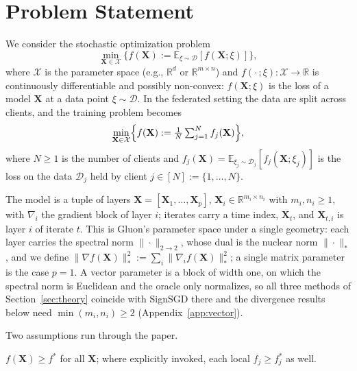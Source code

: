 \section{Problem Statement}\label{sec:proState}

We consider the stochastic optimization problem
\begin{equation}
\min_{\mathbf{X} \in \mathcal{X}} \{f(\mathbf{X}) := \mathbb{E}_{\xi \sim \mathcal{D}} [f(\mathbf{X};\xi)]\},
\end{equation}
where $\mathcal{X}$ is the parameter space (e.g., $\mathbb{R}^d$ or $\mathbb{R}^{m \times n}$) and $f(\cdot\,;\xi) : \mathcal{X} \to \mathbb{R}$ is continuously differentiable and possibly non-convex: $f(\mathbf{X};\xi)$ is the loss of a model $\mathbf{X}$ at a data point $\xi \sim \mathcal{D}$. In the federated setting the data are split across clients, and the training problem becomes
\begin{equation}
\min_{\mathbf{X} \in \mathcal{X}} \Bigl\{ f(\mathbf{X}) := \tfrac{1}{N}\textstyle\sum_{j=1}^N f_j(\mathbf{X})\Bigr\},
\label{fed_eq}
\end{equation}
where $N \ge 1$ is the number of clients and $f_j(\mathbf{X})=\mathbb{E}_{\xi_j\sim\mathcal{D}_j}[f_j(\mathbf{X};\xi_j)]$ is the loss on the data $\mathcal{D}_j$ held by client $j \in [N] := \{1, \dots, N\}$.

The model is a tuple of layers $\mathbf{X} = [\mathbf{X}_1,\dots,\mathbf{X}_p]$, $\mathbf{X}_i \in \mathbb{R}^{m_i\times n_i}$ with $m_i,n_i\ge1$, with $\nabla_i$ the gradient block of layer $i$; iterates carry a time index, $\mathbf{X}_t$, and $\mathbf{X}_{t,i}$ is layer $i$ of iterate $t$. This is Gluon's parameter space \citep{riabinin2025gluon} under a single geometry: each layer carries the spectral norm $\|\cdot\|_{2\to2}$, whose dual is the nuclear norm $\|\cdot\|_{*}$, and we define $\|\nabla f(\mathbf{X})\|_*^2 := \sum_i\|\nabla_i f(\mathbf{X})\|_*^2$; a single matrix parameter is the case $p=1$. A vector parameter is a block of width one, on which the spectral norm is Euclidean and the oracle only normalizes, so all three methods of Section~\ref{sec:theory} coincide with SignSGD there and the divergence results below need $\min(m_i,n_i)\ge2$ (Appendix~\ref{app:vector}).

Two assumptions run through the paper.

\begin{assumption}\label{as:1}
$f(\mathbf{X}) \ge f^*$ for all $\mathbf{X}$; where explicitly invoked, each local $f_j \ge f_j^*$ as well.
\end{assumption}

